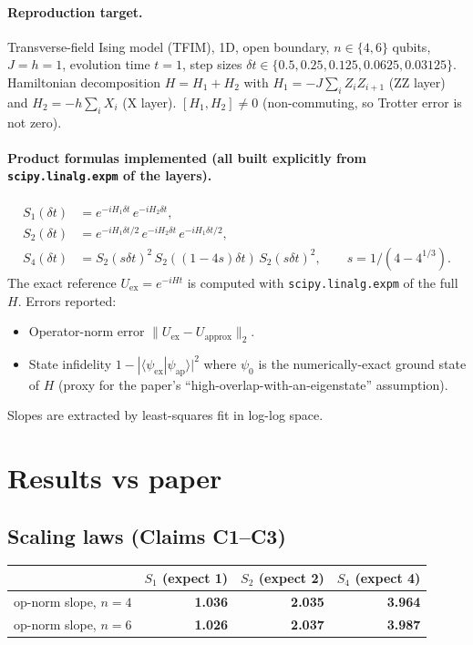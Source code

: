 \documentclass[11pt]{article}
\begin{document}
\paragraph{Reproduction target.}
Transverse-field Ising model (TFIM), 1D, open boundary, $n\!\in\!\{4,6\}$ qubits,
$J=h=1$, evolution time $t=1$, step sizes $\delta t\in\{0.5, 0.25, 0.125, 0.0625, 0.03125\}$.
Hamiltonian decomposition $H = H_1 + H_2$ with
$H_1 = -J\sum_i Z_i Z_{i+1}$ (ZZ layer) and $H_2 = -h\sum_i X_i$ (X layer).
$[H_1,H_2]\ne 0$ (non-commuting, so Trotter error is not zero).

\paragraph{Product formulas implemented (all built explicitly from
\texttt{scipy.linalg.expm} of the layers).}
\begin{align*}
S_1(\delta t) &= e^{-iH_1\delta t}\,e^{-iH_2\delta t}, \\
S_2(\delta t) &= e^{-iH_1\delta t/2}\,e^{-iH_2\delta t}\,e^{-iH_1\delta t/2}, \\
S_4(\delta t) &= S_2(s\delta t)^2\,S_2((1-4s)\delta t)\,S_2(s\delta t)^2,\qquad
                 s = 1/(4-4^{1/3}).
\end{align*}
The exact reference $U_{\text{ex}} = e^{-iHt}$ is computed with \texttt{scipy.linalg.expm}
of the full $H$. Errors reported:
\begin{itemize}
  \item Operator-norm error $\|U_{\text{ex}} - U_{\text{approx}}\|_2$.
  \item State infidelity $1-|\langle\psi_{\text{ex}}|\psi_{\text{ap}}\rangle|^2$ where $\psi_0$
        is the numerically-exact ground state of $H$ (proxy for the paper's
        ``high-overlap-with-an-eigenstate'' assumption).
\end{itemize}
Slopes are extracted by least-squares fit in log-log space.

\section{Results vs paper}

\subsection{Scaling laws (Claims C1--C3)}

\begin{center}
\begin{tabular}{@{}l r r r@{}}
\toprule
& $S_1$ (expect 1) & $S_2$ (expect 2) & $S_4$ (expect 4) \\
\midrule
op-norm slope, $n=4$ & \textbf{1.036} & \textbf{2.035} & \textbf{3.964} \\
op-norm slope, $n=6$ & \textbf{1.026} & \textbf{2.037} & \textbf{3.987} \\
\bottomrule
\end{tabular}
\end{center}
\end{document}
